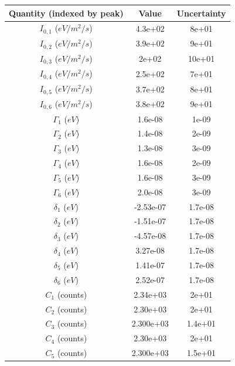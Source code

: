 \documentclass[reprint, nobibnotes, amssymb, amsmath, amsfonts, mathtools, mathrsfs, floatfix]{revtex4-1}
\begin{document}
      \begin{table}[h]
        \centering
        \begin{tabular}{|c|c|c|}
          \hline
           Quantity (indexed by peak) & Value & Uncertainty \\ \hline \hline
           $I_{0, 1}$ ($eV/m^2/s$) & 4.3e+02 & 8e+01 \\ \hline
           $I_{0, 2}$ ($eV/m^2/s$) & 3.9e+02 & 9e+01 \\ \hline
           $I_{0, 3}$ ($eV/m^2/s$) & 2e+02 & 10e+01 \\ \hline
           $I_{0, 4}$ ($eV/m^2/s$) & 2.5e+02 & 7e+01 \\ \hline
           $I_{0, 5}$ ($eV/m^2/s$) & 3.7e+02 & 8e+01 \\ \hline
           $I_{0, 6}$ ($eV/m^2/s$) & 3.8e+02 & 9e+01 \\ \hline \hline
           $\Gamma_1$ ($eV$) & 1.6e-08 & 1e-09 \\ \hline
           $\Gamma_2$ ($eV$) & 1.4e-08 & 2e-09 \\ \hline
           $\Gamma_3$ ($eV$) & 1.3e-08 & 3e-09 \\ \hline
           $\Gamma_4$ ($eV$) & 1.6e-08 & 2e-09 \\ \hline
           $\Gamma_5$ ($eV$) & 1.6e-08 & 3e-09 \\ \hline
           $\Gamma_6$ ($eV$) & 2.0e-08 & 3e-09 \\ \hline \hline
           $\delta_{1}$ ($eV$) & -2.53e-07 & 1.7e-08 \\ \hline
           $\delta_{2}$ ($eV$) & -1.51e-07 & 1.7e-08 \\ \hline
           $\delta_{3}$ ($eV$) & -4.57e-08 & 1.7e-08 \\ \hline
           $\delta_{4}$ ($eV$) & 3.27e-08 & 1.7e-08 \\ \hline
           $\delta_{5}$ ($eV$) & 1.41e-07 & 1.7e-08 \\ \hline
           $\delta_{6}$ ($eV$) & 2.52e-07 & 1.7e-08 \\ \hline \hline
           $C_1$ (counts) & 2.34e+03 & 2e+01 \\ \hline
           $C_2$ (counts) & 2.30e+03 & 2e+01 \\ \hline
           $C_3$ (counts) & 2.300e+03 & 1.4e+01 \\ \hline
           $C_4$ (counts) & 2.30e+03 & 2e+01 \\ \hline
           $C_5$ (counts) & 2.300e+03 & 1.5e+01 \\ \hline

\end{tabular}
\end{table}
\end{document}
